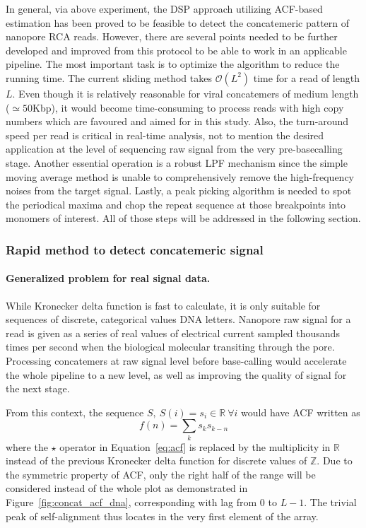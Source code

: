 In general, via above experiment, the DSP approach utilizing ACF-based estimation has been proved to be feasible to detect the concatemeric pattern of nanopore RCA reads.
However, there are several points needed to be further developed and improved from this protocol to be able to work in an applicable pipeline.
The most important task is to optimize the algorithm to reduce the running time. The current sliding method takes $\mathcal{O}(L^2)$ time for a read of length $L$.
Even though it is relatively reasonable for viral concatemers of medium length ($\simeq 50$Kbp), it would become time-consuming to process reads with high copy numbers which are favoured and aimed for in this study.
Also, the turn-around speed per read is critical in real-time analysis, not to mention the desired application at the level of sequencing raw signal from the very pre-basecalling stage.
Another essential operation is a robust LPF mechanism since the simple moving average method is unable to comprehensively remove the high-frequency noises from the target signal. Lastly, a peak picking algorithm is needed to spot the periodical maxima and chop the repeat sequence at those breakpoints into monomers of interest.
All of those steps will be addressed in the following section.

\subsubsection{Rapid method to detect concatemeric signal}
\paragraph{Generalized problem for real signal data.}
While Kronecker delta function is fast to calculate, it is only suitable for sequences of discrete, categorical values \EG{} DNA letters. 
Nanopore raw signal for a read is given as a series of real values of electrical current sampled thousands times per second when the biological molecular transiting through the pore. 
Processing concatemers at raw signal level before base-calling would accelerate the whole pipeline to a new level, as well as improving the quality of signal for the next stage. 

From this context, the sequence $S,\: S(i)=s_i \in \mathbb{R} \: \forall i$ would have ACF written as
\[
 f(n)=\sum_{k}{s_{k}s_{k-n}}   
\]
where the $\star$ operator in Equation~\ref{eq:acf} is replaced by the multiplicity in $\mathbb{R}$ instead of the previous Kronecker delta function for discrete values of $\mathbb{Z}$.
Due to the symmetric property of ACF, only the right half of the range will be considered instead of the whole plot as demonstrated in Figure~\ref{fig:concat_acf_dna}, corresponding with lag from $0$ to $L-1$. The trivial peak of self-alignment thus locates in the very first element of the array.
